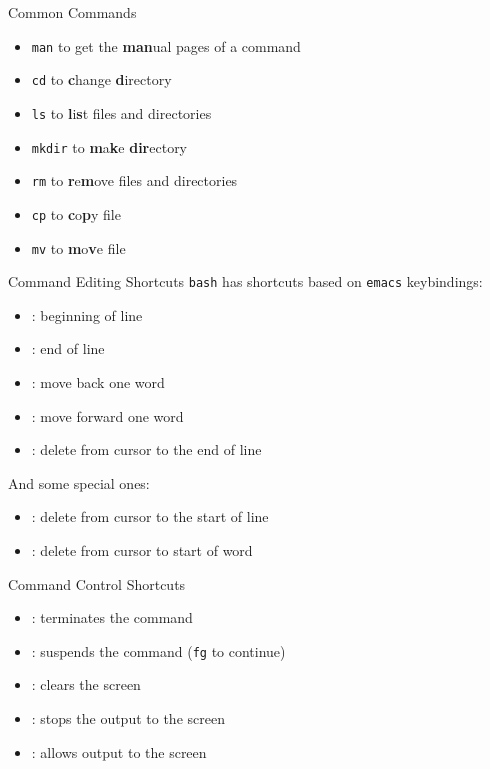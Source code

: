 \documentclass[12pt]{beamer}
\begin{document}
\begin{frame}{Common Commands}
  \begin{itemize}
    \item \texttt{man} to get the \textbf{man}ual pages of a command
    \item \texttt{cd} to \textbf{c}hange \textbf{d}irectory
    \item \texttt{ls} to \textbf{l}i\textbf{s}t files and directories
    \item \texttt{mkdir} to \textbf{m}a\textbf{k}e \textbf{dir}ectory
    \item \texttt{rm} to \textbf{r}e\textbf{m}ove files and directories
    \item \texttt{cp} to \textbf{c}o\textbf{p}y file
    \item \texttt{mv} to \textbf{m}o\textbf{v}e file
  \end{itemize}
\end{frame}

\begin{frame}{Command Editing Shortcuts}
  \texttt{bash} has shortcuts based on \texttt{emacs} keybindings:
  \begin{itemize}
    \item {}: beginning of line
    \item {}: end of line
    \item {}: move back one word
    \item {}: move forward one word
    \item {}: delete from cursor to the end of line
  \end{itemize}
  And some special ones:
  \begin{itemize}
    \item {}: delete from cursor to the start of line
    \item {}: delete from cursor to start of word
  \end{itemize}
\end{frame}

\begin{frame}{Command Control Shortcuts}
  \begin{itemize}
    \item {}: terminates the command
    \item {}: suspends the command (\texttt{fg} to continue)
    \item {}: clears the screen
    \item {}: stops the output to the screen
    \item {}: allows output to the screen
  \end{itemize}
\end{frame}
\end{document}
